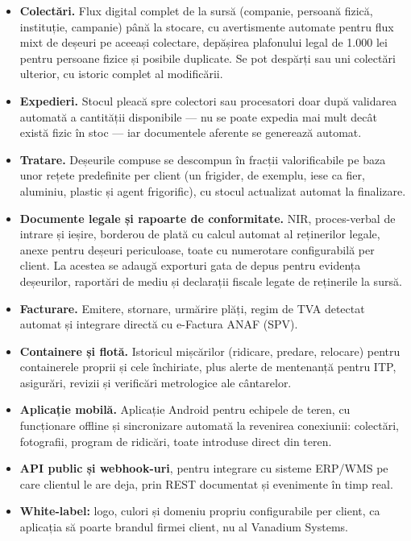 \documentclass[11pt, a4paper]{article}
\begin{document}
\begin{itemize}[leftmargin=1.5em, itemsep=0.35em]
  \item \textbf{Colectări.} Flux digital complet de la sursă (companie, persoană fizică,
  instituție, campanie) până la stocare, cu avertismente automate pentru flux mixt de deșeuri pe
  aceeași colectare, depășirea plafonului legal de 1.000 lei pentru persoane fizice și posibile
  duplicate. Se pot despărți sau uni colectări ulterior, cu istoric complet al modificării.
  \item \textbf{Expedieri.} Stocul pleacă spre colectori sau procesatori doar după validarea
  automată a cantității disponibile — nu se poate expedia mai mult decât există fizic în stoc —
  iar documentele aferente se generează automat.
  \item \textbf{Tratare.} Deșeurile compuse se descompun în fracții valorificabile pe baza unor
  rețete predefinite per client (un frigider, de exemplu, iese ca fier, aluminiu, plastic și
  agent frigorific), cu stocul actualizat automat la finalizare.
  \item \textbf{Documente legale și rapoarte de conformitate.} NIR, proces-verbal de intrare și
  ieșire, borderou de plată cu calcul automat al reținerilor legale, anexe pentru deșeuri
  periculoase, toate cu numerotare configurabilă per client. La acestea se adaugă exporturi gata
  de depus pentru evidența deșeurilor, raportări de mediu și declarații fiscale legate de
  reținerile la sursă.
  \item \textbf{Facturare.} Emitere, stornare, urmărire plăți, regim de TVA detectat automat și
  integrare directă cu e-Factura ANAF (SPV).
  \item \textbf{Containere și flotă.} Istoricul mișcărilor (ridicare, predare, relocare) pentru
  containerele proprii și cele închiriate, plus alerte de mentenanță pentru ITP, asigurări,
  revizii și verificări metrologice ale cântarelor.
  \item \textbf{Aplicație mobilă.} Aplicație Android pentru echipele de teren, cu funcționare
  offline și sincronizare automată la revenirea conexiunii: colectări, fotografii, program de
  ridicări, toate introduse direct din teren.
  \item \textbf{API public și webhook-uri}, pentru integrare cu sisteme ERP/WMS pe care clientul
  le are deja, prin REST documentat și evenimente în timp real.
  \item \textbf{White-label:} logo, culori și domeniu propriu configurabile per client, ca
  aplicația să poarte brandul firmei client, nu al Vanadium Systems.
\end{itemize}
\end{document}
